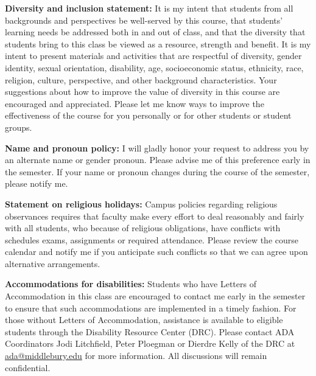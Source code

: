 \documentclass[11pt, a4paper]{article}
\begin{document}
\noindent \textbf{Diversity and inclusion statement:} It is my intent
that students from all backgrounds and perspectives be well-served by
this course, that students' learning needs be addressed both in and out
of class, and that the diversity that students bring to this class be
viewed as a resource, strength and benefit. It is my intent to present
materials and activities that are respectful of diversity, gender
identity, sexual orientation, disability, age, socioeconomic status,
ethnicity, race, religion, culture, perspective, and other background
characteristics. Your suggestions about how to improve the value of
diversity in this course are encouraged and appreciated. Please let me
know ways to improve the effectiveness of the course for you personally
or for other students or student groups.

\vspace{4mm}

\noindent \textbf{Name and pronoun policy:} I will gladly honor your
request to address you by an alternate name or gender pronoun. Please
advise me of this preference early in the semester. If your name or
pronoun changes during the course of the semester, please notify me.

\vspace{4mm}

\noindent \textbf{Statement on religious holidays:} Campus policies
regarding religious observances requires that faculty make every effort
to deal reasonably and fairly with all students, who because of
religious obligations, have conflicts with schedules exams, assignments
or required attendance. Please review the course calendar and notify me
if you anticipate such conflicts so that we can agree upon alternative
arrangements.

\vspace{4mm}

\noindent \textbf{Accommodations for disabilities:} Students who have
Letters of Accommodation in this class are encouraged to contact me
early in the semester to ensure that such accommodations are implemented
in a timely fashion. For those without Letters of Accommodation,
assistance is available to eligible students through the Disability
Resource Center (DRC). Please contact ADA Coordinators Jodi Litchfield,
Peter Ploegman or Dierdre Kelly of the DRC at
\href{mailto:ada@middlebury.edu}{ada@middlebury.edu} for more
information. All discussions will remain confidential.

\vspace{4mm}
\end{document}
